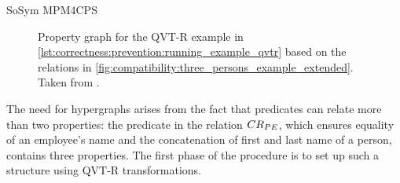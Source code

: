 \begin{copiedFrom}{SoSym MPM4CPS}
\begin{figure}
    \centering
    \resizebox{\linewidth}{!}{}
    \resizebox{\linewidth}{!}{}
    \caption[Property graph for the running example]{Property graph for the QVT-R example in \autoref{lst:correctness:prevention:running_example_qvtr} based on the relations in \autoref{fig:compatibility:three_persons_example_extended}. Taken from .}
    \label{fig:compatibility:propertygraph_re}
\end{figure}


The need for hypergraphs arises from the fact that predicates can relate more than two properties: the predicate in the relation $CR_{PE}$, which ensures equality of an employee's name and the concatenation of first and last name of a person, contains three properties.
The first phase of the procedure is to set up such a structure using QVT-R transformations. 




\end{copiedFrom}
